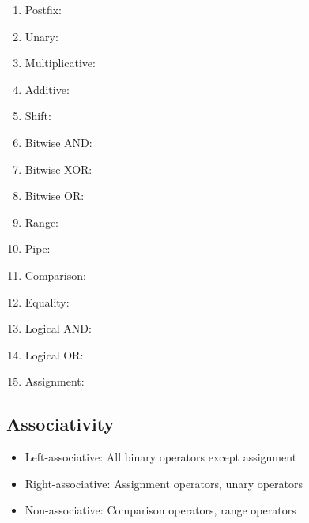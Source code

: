 \begin{enumerate}
    \item Postfix: \code{()} \code{[]}  
    \item Unary: \code{!} \code{-} \code{\~{}} 
    \item Multiplicative: \code{*} \code{/} \code{\%}
    \item Additive: \code{+} \code{-}
    \item Shift: \code{<<} \code{>>} \code{>>>}
    \item Bitwise AND: \code{\&}
    \item Bitwise XOR: \code{\^{}}
    \item Bitwise OR: \code{|}
    \item Range:  
    \item Pipe: \code{|>}
    \item Comparison: \code{<} \code{>} \code{<=} \code{>=}
    \item Equality: \code{==} \code{!=}
    \item Logical AND:  \code{\&\&}
    \item Logical OR:  \code{||}
    \item Assignment: \code{=} \code{+=} \code{-=} \code{*=} \code{/=} \code{\&=} \code{|=} \code{\^{}=} \code{<<=} \code{>>=} \code{>>>=}
\end{enumerate}

\subsection{Associativity}

\begin{itemize}
    \item Left-associative: All binary operators except assignment
    \item Right-associative: Assignment operators, unary operators
    \item Non-associative: Comparison operators, range operators
\end{itemize}
